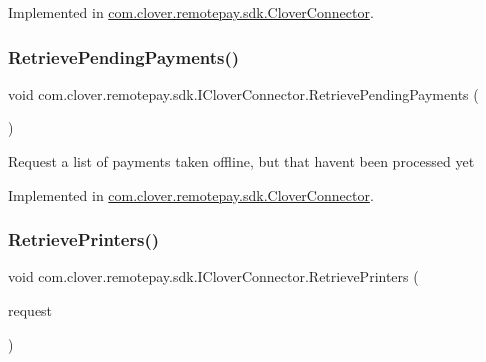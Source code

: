 Implemented in \hyperlink{classcom_1_1clover_1_1remotepay_1_1sdk_1_1_clover_connector_a786435c5849a2d8befd83173f70e05a7}{com.\+clover.\+remotepay.\+sdk.\+Clover\+Connector}.

\mbox{\label{interfacecom_1_1clover_1_1remotepay_1_1sdk_1_1_i_clover_connector_a5d371f91336d4950e32ff051061ad91d}} 
\subsubsection{\texorpdfstring{Retrieve\+Pending\+Payments()}{RetrievePendingPayments()}}
{\footnotesize\ttfamily void com.\+clover.\+remotepay.\+sdk.\+I\+Clover\+Connector.\+Retrieve\+Pending\+Payments (\begin{DoxyParamCaption}{ }\end{DoxyParamCaption})}



Request a list of payments taken offline, but that haven\textquotesingle{}t been processed yet 



Implemented in \hyperlink{classcom_1_1clover_1_1remotepay_1_1sdk_1_1_clover_connector_a8ba5ef9b937ad8edc9cd5052826da2ed}{com.\+clover.\+remotepay.\+sdk.\+Clover\+Connector}.

\mbox{\label{interfacecom_1_1clover_1_1remotepay_1_1sdk_1_1_i_clover_connector_afae3060fb1b64065a2788af99031bbf4}} 
\subsubsection{\texorpdfstring{Retrieve\+Printers()}{RetrievePrinters()}}
{\footnotesize\ttfamily void com.\+clover.\+remotepay.\+sdk.\+I\+Clover\+Connector.\+Retrieve\+Printers (\begin{DoxyParamCaption}\item[{Retrieve\+Printers\+Request}]{request }\end{DoxyParamCaption})}



